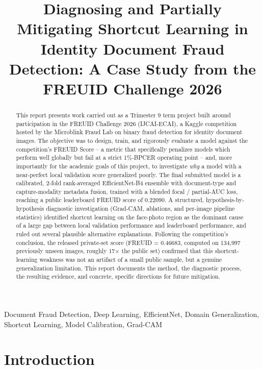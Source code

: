 \documentclass{article}
\title{Diagnosing and Partially Mitigating Shortcut Learning in Identity
Document Fraud Detection: A Case Study from the FREUID Challenge 2026}
\begin{document}
\ninept
\maketitle

\begin{abstract}
This report presents work carried out as a Trimester 9 term project built
around participation in the FREUID Challenge 2026 (IJCAI-ECAI), a Kaggle
competition hosted by the Microblink Fraud Lab on binary fraud detection for
identity document images. The objective was to design, train, and rigorously
evaluate a model against the competition's FREUID Score -- a metric that
specifically penalizes models which perform well globally but fail at a
strict 1\%-BPCER operating point -- and, more importantly for the academic
goals of this project, to investigate \emph{why} a model with a
near-perfect local validation score generalized poorly. The final submitted
model is a calibrated, 2-fold rank-averaged EfficientNet-B4 ensemble with
document-type and capture-modality metadata fusion, trained with a blended
focal / partial-AUC loss, reaching a public leaderboard FREUID score of
0.22090. A structured, hypothesis-by-hypothesis diagnostic investigation
(Grad-CAM, ablations, and per-image pipeline statistics) identified
shortcut learning on the face-photo region as the dominant cause of a large
gap between local validation performance and leaderboard performance, and
ruled out several plausible alternative explanations. Following the
competition's conclusion, the released private-set score (FREUID = 0.46683,
computed on 134,997 previously unseen images, roughly 17$\times$ the public
set) confirmed that this shortcut-learning weakness was not an artifact of
a small public sample, but a genuine generalization limitation. This report
documents the method, the diagnostic process, the resulting evidence, and
concrete, specific directions for future mitigation.
\end{abstract}

\begin{keywords}
Document Fraud Detection, Deep Learning, EfficientNet, Domain
Generalization, Shortcut Learning, Model Calibration, Grad-CAM
\end{keywords}

\section{Introduction}
\end{document}

